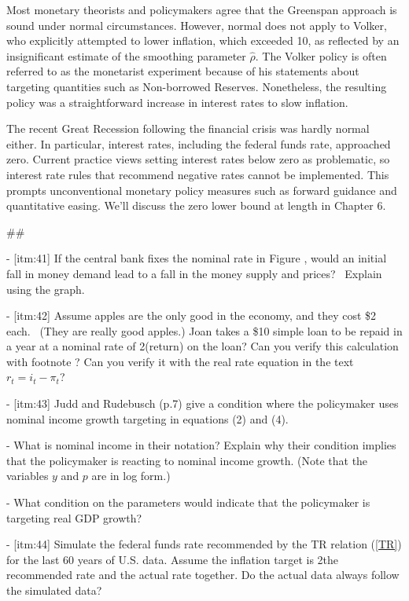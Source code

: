 ﻿\documentclass[oneside]{book}
\begin{document}
Most monetary theorists and policymakers agree that the Greenspan approach
is sound under normal circumstances. However, normal does not apply to
Volker, who explicitly attempted to lower inflation, which exceeded
10\aggressive, as reflected by an insignificant estimate of the smoothing
parameter $\widehat{\rho }$. The Volker policy is often referred to as the
monetarist experiment because of his statements about targeting quantities such as Non-borrowed Reserves. Nonetheless, the resulting policy was a straightforward increase in interest rates to slow inflation.

The recent Great Recession following the financial crisis was hardly normal either. In particular, interest rates, including the federal funds rate,
approached zero. Current practice views setting interest rates below zero as
problematic, so interest rate rules that recommend negative rates cannot be
implemented. This prompts unconventional monetary policy measures
such as forward guidance and quantitative easing. We'll discuss the zero
lower bound at length in Chapter 6.



##




- [itm:41] If the central bank fixes the nominal rate in Figure , would an initial fall in money demand lead to a fall in the money supply and prices?
\ Explain using the graph.

- [itm:42] Assume apples are the only good in the economy, and they cost \$2 each. \
(They are really good apples.) Joan takes a \$10 simple loan to be repaid
in a year at a nominal rate of 2\rate (return) on the loan? Can you verify this calculation with footnote ? Can you verify it with the real rate equation in the text $r_{t}=i_{t}-\pi _{t}$?

- [itm:43] Judd and Rudebusch (p.7) give a condition where the policymaker uses nominal income growth targeting in equations (2) and (4).


- What is nominal income in their notation? Explain why their condition
implies that the policymaker is reacting to nominal income growth. (Note that the variables $y$ and $p$ are in log form.)

- What condition on the parameters would indicate that the policymaker
is targeting real GDP growth?

- [itm:44] Simulate the federal funds rate recommended by the TR relation (\ref{TR}) for the last 60 years of U.S. data. Assume the inflation target is
2\graph the recommended rate and the actual rate together. Do the actual
data always follow the simulated data?
\end{document}

